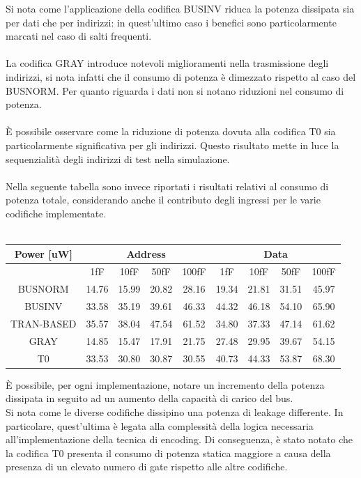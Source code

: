 \documentclass[11pt,  english, makeidx, a4paper, titlepage, oneside]{book}
\begin{document}
Si nota come l'applicazione della codifica BUSINV riduca la potenza dissipata sia per dati che per indirizzi: in quest'ultimo caso i benefici sono particolarmente marcati nel caso di salti frequenti.
\\\\
La codifica GRAY introduce notevoli miglioramenti nella trasmissione degli indirizzi, si nota infatti che il consumo di potenza è dimezzato rispetto al caso del BUSNORM. Per quanto riguarda i dati non si notano riduzioni nel consumo di potenza.
\\\\
È possibile osservare come la riduzione di potenza dovuta alla codifica T0 sia particolarmente significativa per gli indirizzi. Questo risultato mette in luce la sequenzialità degli indirizzi di test nella simulazione.
\\\\
Nella seguente tabella sono invece riportati i risultati relativi al consumo di potenza totale, considerando anche il contributo degli ingressi per le varie codifiche implementate.
\\\\
\begin{center}
	\begin{tabular}{|c|c|c|c|c||c|c|c|c|}
	\hline
	Power [uW] & \multicolumn{4}{c}{Address} & \multicolumn{4}{c}{Data}\\
	\hline
	 & 1fF & 10fF & 50fF & 100fF & 1fF & 10fF & 50fF & 100fF \\
	\hline
	BUSNORM & 14.76 & 15.99 & 20.82 & 28.16 & 19.34 & 21.81 & 31.51 & 45.97 \\
	 \hline
	BUSINV & 33.58 & 35.19 & 39.61 & 46.33 & 44.32 & 46.18 & 54.10 & 65.90 \\
	\hline
	TRAN-BASED & 35.57 & 38.04 & 47.54 & 61.52 & 34.80 & 37.33 & 47.14 & 61.62 \\
	\hline
	GRAY & 14.85 & 15.47 & 17.91 & 21.75 & 27.48 & 29.95 & 39.67 & 54.15 \\
	\hline
	T0 & 33.53 & 30.80 & 30.87 & 30.55 & 40.73 & 44.33 & 53.87 & 68.30 \\
	\hline
	\end{tabular}	
\end{center}
\vspace{0.3cm}
È possibile, per ogni implementazione, notare un incremento della potenza dissipata in seguito ad un aumento della capacità di carico del bus.
\\
Si nota come le diverse codifiche dissipino una potenza di leakage differente. In particolare, quest'ultima è legata alla complessità della logica necessaria all'implementazione della tecnica di encoding. Di conseguenza, è stato notato che la codifica T0 presenta il consumo di potenza statica maggiore a causa della presenza di un elevato numero di gate rispetto alle altre codifiche.
\end{document}
